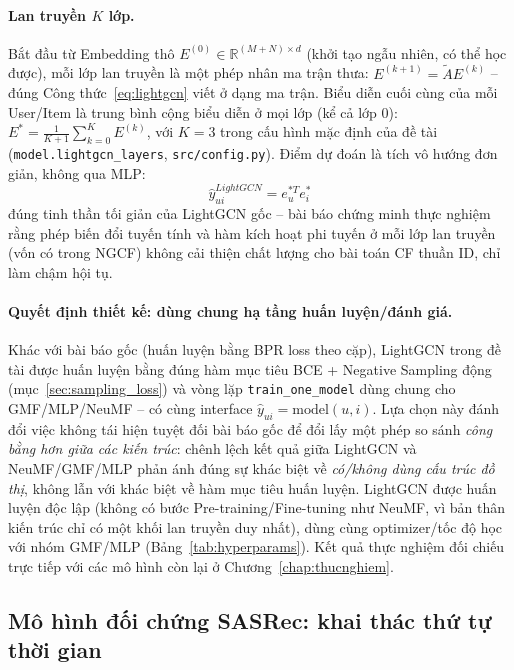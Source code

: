 \paragraph{Lan truyền $K$ lớp.} Bắt đầu từ Embedding thô $E^{(0)} \in \mathbb{R}^{(M+N)\times d}$ (khởi tạo ngẫu nhiên, có thể học được), mỗi lớp lan truyền là một phép nhân ma trận thưa: $E^{(k+1)} = \tilde{A} E^{(k)}$ -- đúng Công thức~\eqref{eq:lightgcn} viết ở dạng ma trận. Biểu diễn cuối cùng của mỗi User/Item là trung bình cộng biểu diễn ở mọi lớp (kể cả lớp 0): $E^{*} = \frac{1}{K+1}\sum_{k=0}^{K} E^{(k)}$, với $K=3$ trong cấu hình mặc định của đề tài (\texttt{model.lightgcn\_layers}, \texttt{src/config.py}). Điểm dự đoán là tích vô hướng đơn giản, không qua MLP:
\begin{equation}
    \hat{y}_{ui}^{LightGCN} = e_u^{*T} e_i^{*}
    \label{eq:lightgcn_predict}
\end{equation}
đúng tinh thần tối giản của LightGCN gốc -- bài báo chứng minh thực nghiệm rằng phép biến đổi tuyến tính và hàm kích hoạt phi tuyến ở mỗi lớp lan truyền (vốn có trong NGCF) không cải thiện chất lượng cho bài toán CF thuần ID, chỉ làm chậm hội tụ.

\paragraph{Quyết định thiết kế: dùng chung hạ tầng huấn luyện/đánh giá.} Khác với bài báo gốc (huấn luyện bằng BPR loss theo cặp), LightGCN trong đề tài được huấn luyện bằng đúng hàm mục tiêu BCE + Negative Sampling động (mục~\ref{sec:sampling_loss}) và vòng lặp \texttt{train\_one\_model} dùng chung cho GMF/MLP/NeuMF -- có cùng interface $\hat{y}_{ui} = \text{model}(u, i)$. Lựa chọn này đánh đổi việc không tái hiện tuyệt đối bài báo gốc để đổi lấy một phép so sánh \emph{công bằng hơn giữa các kiến trúc}: chênh lệch kết quả giữa LightGCN và NeuMF/GMF/MLP phản ánh đúng sự khác biệt về \emph{có/không dùng cấu trúc đồ thị}, không lẫn với khác biệt về hàm mục tiêu huấn luyện. LightGCN được huấn luyện độc lập (không có bước Pre-training/Fine-tuning như NeuMF, vì bản thân kiến trúc chỉ có một khối lan truyền duy nhất), dùng cùng optimizer/tốc độ học với nhóm GMF/MLP (Bảng~\ref{tab:hyperparams}). Kết quả thực nghiệm đối chiếu trực tiếp với các mô hình còn lại ở Chương~\ref{chap:thucnghiem}.

\subsection{Mô hình đối chứng SASRec: khai thác thứ tự thời gian}
\label{subsec:sasrec_design}

